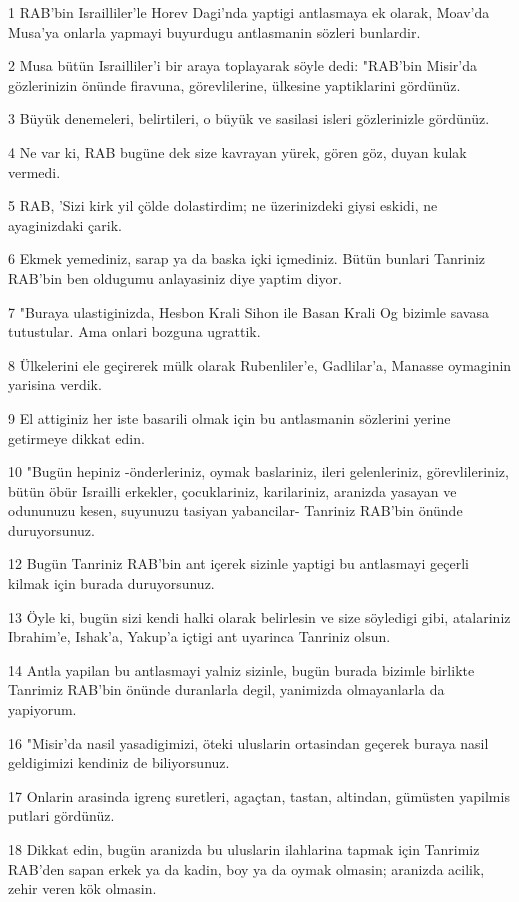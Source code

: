 \par 1 RAB'bin Israilliler'le Horev Dagi'nda yaptigi antlasmaya ek olarak, Moav'da Musa'ya onlarla yapmayi buyurdugu antlasmanin sözleri bunlardir.
\par 2 Musa bütün Israilliler'i bir araya toplayarak söyle dedi: "RAB'bin Misir'da gözlerinizin önünde firavuna, görevlilerine, ülkesine yaptiklarini gördünüz.
\par 3 Büyük denemeleri, belirtileri, o büyük ve sasilasi isleri gözlerinizle gördünüz.
\par 4 Ne var ki, RAB bugüne dek size kavrayan yürek, gören göz, duyan kulak vermedi.
\par 5 RAB, 'Sizi kirk yil çölde dolastirdim; ne üzerinizdeki giysi eskidi, ne ayaginizdaki çarik.
\par 6 Ekmek yemediniz, sarap ya da baska içki içmediniz. Bütün bunlari Tanriniz RAB'bin ben oldugumu anlayasiniz diye yaptim diyor.
\par 7 "Buraya ulastiginizda, Hesbon Krali Sihon ile Basan Krali Og bizimle savasa tutustular. Ama onlari bozguna ugrattik.
\par 8 Ülkelerini ele geçirerek mülk olarak Rubenliler'e, Gadlilar'a, Manasse oymaginin yarisina verdik.
\par 9 El attiginiz her iste basarili olmak için bu antlasmanin sözlerini yerine getirmeye dikkat edin.
\par 10 "Bugün hepiniz -önderleriniz, oymak baslariniz, ileri gelenleriniz, görevlileriniz, bütün öbür Israilli erkekler, çocuklariniz, karilariniz, aranizda yasayan ve odununuzu kesen, suyunuzu tasiyan yabancilar- Tanriniz RAB'bin önünde duruyorsunuz.
\par 12 Bugün Tanriniz RAB'bin ant içerek sizinle yaptigi bu antlasmayi geçerli kilmak için burada duruyorsunuz.
\par 13 Öyle ki, bugün sizi kendi halki olarak belirlesin ve size söyledigi gibi, atalariniz Ibrahim'e, Ishak'a, Yakup'a içtigi ant uyarinca Tanriniz olsun.
\par 14 Antla yapilan bu antlasmayi yalniz sizinle, bugün burada bizimle birlikte Tanrimiz RAB'bin önünde duranlarla degil, yanimizda olmayanlarla da yapiyorum.
\par 16 "Misir'da nasil yasadigimizi, öteki uluslarin ortasindan geçerek buraya nasil geldigimizi kendiniz de biliyorsunuz.
\par 17 Onlarin arasinda igrenç suretleri, agaçtan, tastan, altindan, gümüsten yapilmis putlari gördünüz.
\par 18 Dikkat edin, bugün aranizda bu uluslarin ilahlarina tapmak için Tanrimiz RAB'den sapan erkek ya da kadin, boy ya da oymak olmasin; aranizda acilik, zehir veren kök olmasin.
